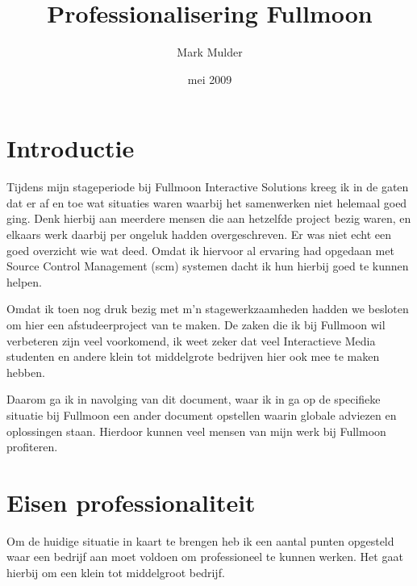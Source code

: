 \documentclass[12pt,a4paper]{article}
\title{Professionalisering Fullmoon}
\author{Mark Mulder}
\date{mei 2009}
\begin{document}
  
  \maketitle
  \pagebreak
  
  \tableofcontents  
  \pagebreak
  
  \section{Introductie}

  Tijdens mijn stageperiode bij Fullmoon Interactive Solutions kreeg ik in de gaten dat er af en toe wat situaties waren waarbij het samenwerken niet helemaal goed ging. Denk hierbij aan meerdere mensen die aan hetzelfde project bezig waren, en elkaars werk daarbij per ongeluk hadden overgeschreven. Er was niet echt een goed overzicht wie wat deed. Omdat ik hiervoor al ervaring had opgedaan met Source Control Management {\sc (scm)} systemen dacht ik hun hierbij goed te kunnen helpen.
    
    Omdat ik toen nog druk bezig met m'n stagewerkzaamheden hadden we besloten om hier een afstudeerproject van te maken. De zaken die ik bij Fullmoon wil verbeteren zijn veel voorkomend, ik weet zeker dat veel Interactieve Media studenten en andere klein tot middelgrote bedrijven hier ook mee te maken hebben. 
    
    Daarom ga ik in navolging van dit document, waar ik in ga op de specifieke situatie bij Fullmoon een ander document opstellen waarin globale adviezen en oplossingen staan. Hierdoor kunnen veel mensen van mijn werk bij Fullmoon profiteren.
    
    
  \section{Eisen professionaliteit}

  Om de huidige situatie in kaart te brengen heb ik een aantal punten opgesteld waar een bedrijf aan moet voldoen om professioneel te kunnen werken. Het gaat hierbij om een klein tot middelgroot bedrijf.
\end{document}
